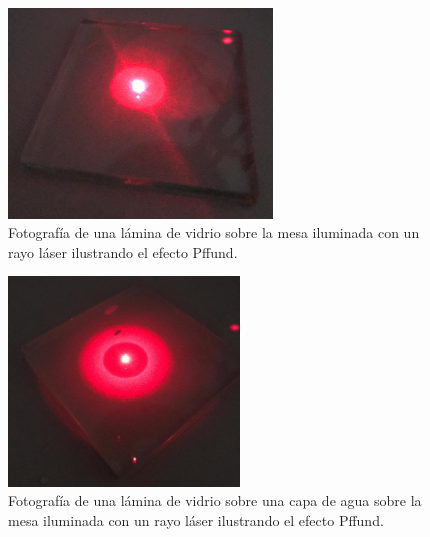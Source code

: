 \documentclass[12pt]{article}
\numberwithin{table}{section}
\numberwithin{figure}{section}
\numberwithin{equation}{section}
\begin{document}
\begin{figure}[!ht]
	\small \centering \sffamily
	\begin{center}
		\includegraphics[width=7cm]{P2PffVidrio.jpeg}
		\caption{Fotografía de una lámina de vidrio sobre la mesa iluminada con un rayo láser ilustrando el efecto Pffund.}
		\label{P2PffFotoVidrio}
	\end{center}
\end{figure}

\begin{figure}[!ht]
	\small \centering \sffamily
	\begin{center}
		\includegraphics[width=6.15cm]{P2PffAgrio.jpeg}
		\caption{Fotografía de una lámina de vidrio sobre una capa de agua sobre la mesa iluminada con un rayo láser ilustrando el efecto Pffund.}
		\label{P2PffFotoAgrio}
	\end{center}
\end{figure}
\end{document}
